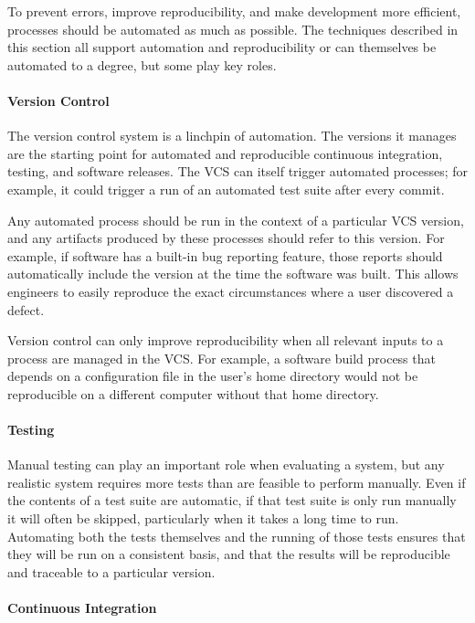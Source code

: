 To prevent errors, improve reproducibility, and make development more
efficient, processes should be automated as much as possible. The
techniques described in this section all support automation and
reproducibility or can themselves be automated to a degree, but some
play key roles.

\paragraph{Version Control}

The version control system is a linchpin of automation. The versions
it manages are the starting point for automated and reproducible
continuous integration, testing, and software releases. The VCS can
itself trigger automated processes; for example, it could trigger a
run of an automated test suite after every commit.

Any automated process should be run in the context of a particular VCS
version, and any artifacts produced by these processes should refer to
this version. For example, if software has a built-in bug reporting
feature, those reports should automatically include the version at the
time the software was built. This allows engineers to easily reproduce
the exact circumstances where a user discovered a defect.

Version control can only improve reproducibility when all relevant
inputs to a process are managed in the VCS. For example, a software
build process that depends on a configuration file in the user's home
directory would not be reproducible on a different computer without
that home directory.

\paragraph{Testing}

Manual testing can play an important role when evaluating a system,
but any realistic system requires more tests than are feasible to
perform manually. Even if the contents of a test suite are automatic,
if that test suite is only run manually it will often be skipped,
particularly when it takes a long time to run. Automating both the
tests themselves and the running of those tests ensures that they will
be run on a consistent basis, and that the results will be
reproducible and traceable to a particular version.

\paragraph{Continuous Integration}

